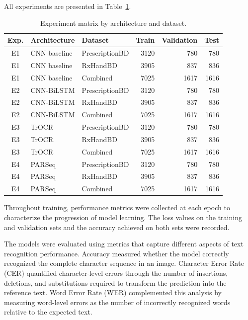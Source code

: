 \documentclass[11pt,a4paper]{article}
\begin{document}
All experiments are presented in Table~\ref{tab:matriz-experimentos}.
\begin{table}[H]
	\centering
	\caption{Experiment matrix by architecture and dataset.}
	\label{tab:matriz-experimentos}
	\begin{tabular}{cllrrr}
		\toprule
		\textbf{Exp.} &
		\textbf{Architecture} &
		\textbf{Dataset} &
		\textbf{Train} &
		\textbf{Validation} &
		\textbf{Test} \\
		\midrule
		
		E1 & CNN baseline & PrescriptionBD & 3120 & 780  & 780  \\
		E1 & CNN baseline & RxHandBD       & 3905 & 837  & 836  \\
		E1 & CNN baseline & Combined       & 7025 & 1617 & 1616 \\
		\midrule
		
		E2 & CNN-BiLSTM   & PrescriptionBD & 3120 & 780  & 780  \\
		E2 & CNN-BiLSTM   & RxHandBD       & 3905 & 837  & 836  \\
		E2 & CNN-BiLSTM   & Combined       & 7025 & 1617 & 1616 \\
		\midrule
		
		E3 & TrOCR        & PrescriptionBD & 3120 & 780  & 780  \\
		E3 & TrOCR        & RxHandBD       & 3905 & 837  & 836  \\
		E3 & TrOCR        & Combined       & 7025 & 1617 & 1616 \\
		\midrule
		
		E4 & PARSeq       & PrescriptionBD & 3120 & 780  & 780  \\
		E4 & PARSeq       & RxHandBD       & 3905 & 837  & 836  \\
		E4 & PARSeq       & Combined       & 7025 & 1617 & 1616 \\
		\bottomrule
	\end{tabular}
\end{table}

Throughout training, performance metrics were collected at each epoch to characterize the progression of model learning. The loss values on the training and validation sets and the accuracy achieved on both sets were recorded.

The models were evaluated using metrics that capture different aspects of text recognition performance. Accuracy measured whether the model correctly recognized the complete character sequence in an image. Character Error Rate (CER) quantified character-level errors through the number of insertions, deletions, and substitutions required to transform the prediction into the reference text. Word Error Rate (WER) complemented this analysis by measuring word-level errors as the number of incorrectly recognized words relative to the expected text.
\end{document}
